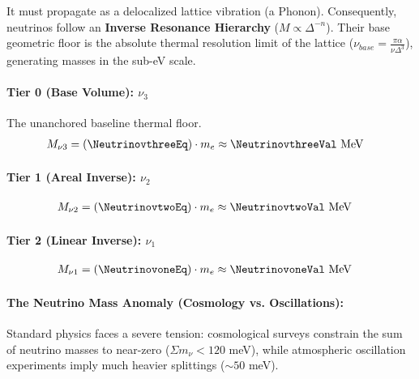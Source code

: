 It must propagate as a delocalized lattice vibration (a Phonon). Consequently, neutrinos follow an \textbf{Inverse Resonance Hierarchy} ($M \propto \Delta^{-n}$). Their base geometric floor is the absolute thermal resolution limit of the lattice ($\nu_{base} = \frac{\pi \alpha}{\nu \Delta^3}$), generating masses in the sub-eV scale.


\paragraph{Tier 0 (Base Volume): $\nu_3$} The unanchored baseline thermal floor.
\begin{align*}
    M_{\nu 3} &= \left( \NeutrinovthreeEq \right) \cdot m_e \approx \NeutrinovthreeVal \text{ MeV}
\end{align*}


\paragraph{Tier 1 (Areal Inverse): $\nu_2$} 
\begin{align*}
    M_{\nu 2} &= \left( \NeutrinovtwoEq \right) \cdot m_e \approx \NeutrinovtwoVal \text{ MeV}
\end{align*}


\paragraph{Tier 2 (Linear Inverse): $\nu_1$} 
\begin{align*}
    M_{\nu 1} &= \left( \NeutrinovoneEq \right) \cdot m_e \approx \NeutrinovoneVal \text{ MeV}
\end{align*}

\paragraph{The Neutrino Mass Anomaly (Cosmology vs. Oscillations):}
Standard physics faces a severe tension: cosmological surveys constrain the sum of neutrino masses to near-zero ($\Sigma m_\nu < 120$ meV), while atmospheric oscillation experiments imply much heavier splittings ($\sim 50$ meV). 


